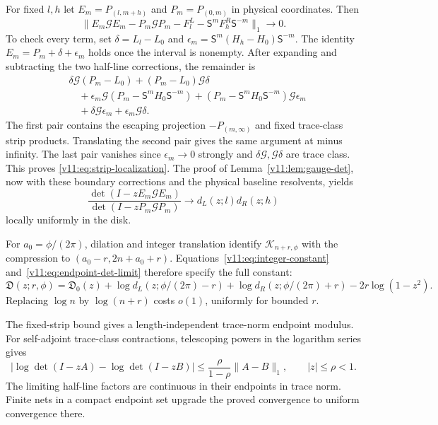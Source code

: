 For fixed $l,h$ let $E_m=P_{(l,m+h)}$ and $P_m=P_{(0,m)}$ in physical
coordinates.  Then
\begin{equation}\label{v11:eq:strip-localization}
 \|E_m\mathcal G E_m-P_m\mathcal G P_m
             -F_l^L-\mathsf S^mF_h^R\mathsf S^{-m}\|_1\to0.
\end{equation}
To check every term, set $\delta=L_l-L_0$ and
$\epsilon_m=\mathsf S^m(H_h-H_0)\mathsf S^{-m}$.
The identity $E_m=P_m+\delta+\epsilon_m$ holds once the interval is
nonempty.  After expanding and subtracting the two half-line
corrections, the remainder is
\begin{align*}
 &\delta\mathcal G(P_m-L_0)+(P_m-L_0)\mathcal G\delta\\
 &\quad+\epsilon_m\mathcal G(P_m-\mathsf S^mH_0\mathsf S^{-m})
       +(P_m-\mathsf S^mH_0\mathsf S^{-m})\mathcal G\epsilon_m\\
 &\quad+\delta\mathcal G\epsilon_m+\epsilon_m\mathcal G\delta.
\end{align*}
The first pair contains the escaping projection $-P_{(m,\infty)}$
and fixed trace-class strip products. Translating the second pair gives
the same argument at minus infinity. The last pair vanishes since
$\epsilon_m\to0$ strongly and $\delta\mathcal G,\mathcal G\delta$
are trace class. This proves \eqref{v11:eq:strip-localization}.
The proof of Lemma~\ref{v11:lem:gauge-det}, now with these boundary
corrections and the physical baseline resolvents, yields
\begin{equation}\label{v11:eq:endpoint-det-limit}
 \frac{\det(I-zE_m\mathcal G E_m)}{\det(I-zP_m\mathcal G P_m)}
       \longrightarrow d_L(z;l)d_R(z;h)
\end{equation}
locally uniformly in the disk.

For $a_0=\phi/(2\pi)$, dilation and integer translation identify
$\mathcal K_{n+r,\phi}$ with the compression to
$(a_0-r,2n+a_0+r)$.  Equations~\eqref{v11:eq:integer-constant}
and~\eqref{v11:eq:endpoint-det-limit} therefore specify the full constant:
\begin{equation}\label{v11:eq:phase-constant-product}
 \mathfrak D(z;r,\phi)=\mathfrak D_0(z)
     +\log d_L(z;\phi/(2\pi)-r)+\log d_R(z;\phi/(2\pi)+r)
     -2r\log(1-z^2).
\end{equation}
Replacing $\log n$ by $\log(n+r)$ costs $o(1)$, uniformly for bounded $r$.

The fixed-strip bound gives a length-independent trace-norm endpoint
modulus. For self-adjoint trace-class contractions, telescoping powers
in the logarithm series gives
\[
 |\log\det(I-zA)-\log\det(I-zB)|
       \le\frac\rho{1-\rho}\|A-B\|_1,
 \qquad |z|\le\rho<1.
\]
The limiting half-line factors are continuous in their endpoints in
trace norm.  Finite nets in a compact endpoint set upgrade the proved
convergence to uniform convergence there.

